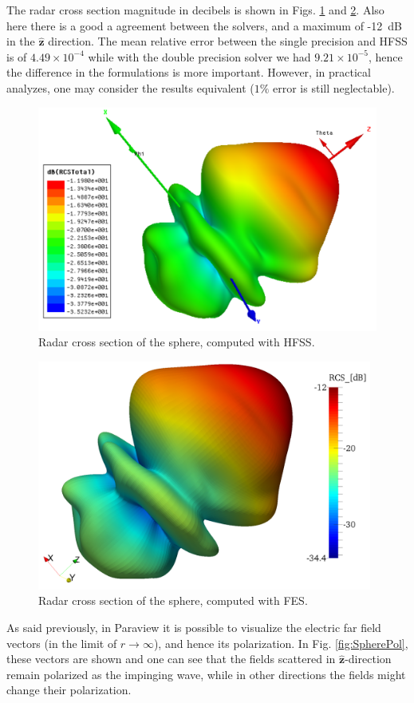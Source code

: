 The radar cross section magnitude in decibels is shown in Figs. \ref{fig:SphereRCSHFSS} and \ref{fig:SphereRCS}. Also here there is a good a agreement between the solvers, and a maximum of -12~dB in the $\hat{\mathbf{z}}$ direction. The mean relative error between the single precision and HFSS is of $4.49\times 10^{-4}$ while with the double precision solver we had $9.21\times 10^{-5}$, hence the difference in the formulations is more important. However, in practical analyzes, one may consider the results equivalent ($1\%$ error is still neglectable).

\begin{figure}[h]
\centering
\includegraphics[width=12.4cm]{SphereRCSHFSS}
\caption{Radar cross section of the sphere, computed with HFSS.}
\label{fig:SphereRCSHFSS}
\end{figure}

\begin{figure}[h]
\centering
\includegraphics[width=11cm]{SphereRCS}
\caption{Radar cross section of the sphere, computed with FES.}
\label{fig:SphereRCS}
\end{figure}
\clearpage
As said previously, in Paraview it is possible to visualize the electric far field vectors (in the limit of $r\rightarrow \infty$), and hence its polarization. In Fig. \ref{fig:SpherePol}, these vectors are shown and one can see that the fields scattered in $\hat{\mathbf{z}}$-direction remain polarized as the impinging wave, while in other directions the fields might change their polarization.

